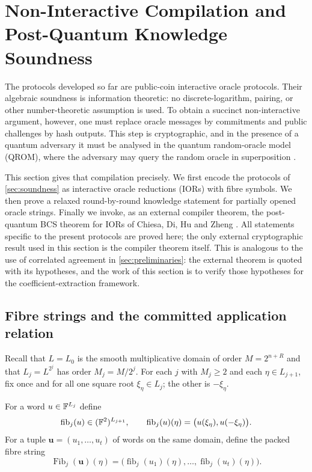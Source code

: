 \section{Non-Interactive Compilation and Post-Quantum Knowledge Soundness}
\label{sec:post-quantum}

The protocols developed so far are public-coin interactive oracle protocols.  Their algebraic soundness is information theoretic: no discrete-logarithm, pairing, or other number-theoretic assumption is used.  To obtain a succinct non-interactive argument, however, one must replace oracle messages by commitments and public challenges by hash outputs.  This step is cryptographic, and in the presence of a quantum adversary it must be analysed in the quantum random-oracle model (QROM), where the adversary may query the random oracle in superposition \cite{BonehEtAl11}.

This section gives that compilation precisely.  We first encode the protocols of \cref{sec:soundness} as interactive oracle reductions (IORs) with fibre symbols.  We then prove a relaxed round-by-round knowledge statement for partially opened oracle strings.  Finally we invoke, as an external compiler theorem, the post-quantum BCS theorem for IORs of Chiesa, Di, Hu and Zheng \cite{CDHZ25}.  All statements specific to the present protocols are proved here; the only external cryptographic result used in this section is the compiler theorem itself.  This is analogous to the use of correlated agreement in \cref{sec:preliminaries}: the external theorem is quoted with its hypotheses, and the work of this section is to verify those hypotheses for the coefficient-extraction framework.

\subsection{Fibre strings and the committed application relation}
\label{sec:pq-fibre-strings}

Recall that $L=L_0$ is the smooth multiplicative domain of order $M=2^{n+R}$ and that $L_j=L^{2^j}$ has order $M_j=M/2^j$.  For each $j$ with $M_j\ge 2$ and each $\eta\in L_{j+1}$, fix once and for all one square root $\xi_\eta\in L_j$; the other is $-\xi_\eta$.

\begin{definition}
\label{def:pq-fibre-string}
For a word $u\in\mathbb{F}^{L_j}$ define
\[
  \operatorname{fib}_j(u)
  \in (\mathbb{F}^2)^{L_{j+1}},
  \qquad
  \operatorname{fib}_j(u)(\eta)
  =\bigl(u(\xi_\eta),u(-\xi_\eta)\bigr).
\]
For a tuple $\mathbf u=(u_1,\ldots,u_t)$ of words on the same domain, define the packed fibre string
\[
  \operatorname{Fib}_j(\mathbf u)(\eta)
  =\bigl(\operatorname{fib}_j(u_1)(\eta),\ldots,
         \operatorname{fib}_j(u_t)(\eta)\bigr).
\]
\end{definition}

